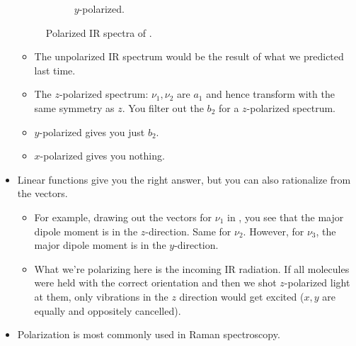 \documentclass[../notes.tex]{subfiles}
\begin{document}
\begin{itemize}
\begin{figure}[h!]
\begin{subfigure}[b]{0.49\linewidth}
            \caption{$y$-polarized.}
            \label{fig:H2O-IRPold}
        \end{subfigure}
        \caption{Polarized IR spectra of .}
        \label{fig:H2O-IRPol}
    \end{figure}
    \begin{itemize}
        \item The unpolarized IR spectrum would be the result of what we predicted last time.
        \item The $z$-polarized spectrum: $\nu_1,\nu_2$ are $a_1$ and hence transform with the same symmetry as $z$. You filter out the $b_2$ for a $z$-polarized spectrum.
        \item $y$-polarized gives you just $b_2$.
        \item $x$-polarized gives you nothing.
    \end{itemize}
    \item Linear functions give you the right answer, but you can also rationalize from the vectors.
    \begin{itemize}
        \item For example, drawing out the vectors for $\nu_1$ in , you see that the major dipole moment is in the $z$-direction. Same for $\nu_2$. However, for $\nu_3$, the major dipole moment is in the $y$-direction.
        \item What we're polarizing here is the incoming IR radiation. If all molecules were held with the correct orientation and then we shot $z$-polarized light at them, only vibrations in the $z$ direction would get excited ($x,y$ are equally and oppositely cancelled).
    \end{itemize}
    \item Polarization is most commonly used in Raman spectroscopy.

\end{itemize}
\end{document}
